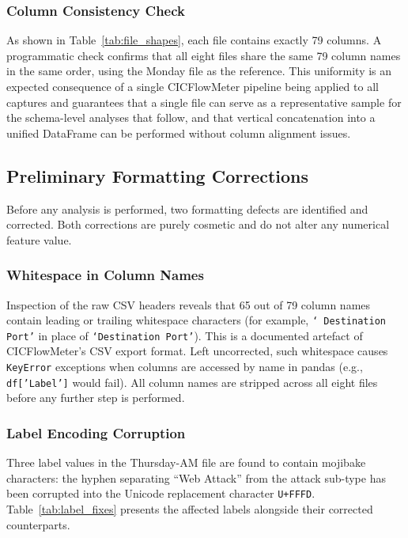 \documentclass[12pt,a4paper]{article}
\begin{document}
\subsubsection{Column Consistency Check}
\label{sec:colconsistency}

As shown in Table~\ref{tab:file_shapes}, each file contains exactly 79 columns.
A programmatic check confirms that all eight files share the same 79 column names
in the same order, using the Monday file as the reference. This uniformity is an
expected consequence of a single CICFlowMeter pipeline being applied to all captures
and guarantees that a single file can serve as a representative sample for the
schema-level analyses that follow, and that vertical concatenation into a unified
DataFrame can be performed without column alignment issues.

\subsection{Preliminary Formatting Corrections}

Before any analysis is performed, two formatting defects are identified and corrected.
Both corrections are purely cosmetic and do not alter any numerical feature value.

\subsubsection{Whitespace in Column Names}

Inspection of the raw CSV headers reveals that 65 out of 79 column names contain
leading or trailing whitespace characters (for example, \texttt{` Destination Port'}
in place of \texttt{`Destination Port'}). This is a documented artefact of
CICFlowMeter's CSV export format. Left uncorrected, such whitespace causes
\texttt{KeyError} exceptions when columns are accessed by name in pandas
(e.g., \texttt{df['Label']} would fail). All column names are stripped across all
eight files before any further step is performed.

\subsubsection{Label Encoding Corruption}

Three label values in the Thursday-AM file are found to contain mojibake characters:
the hyphen separating ``Web Attack'' from the attack sub-type has been corrupted into
the Unicode replacement character \texttt{U+FFFD}. Table~\ref{tab:label_fixes}
presents the affected labels alongside their corrected counterparts.
\end{document}
